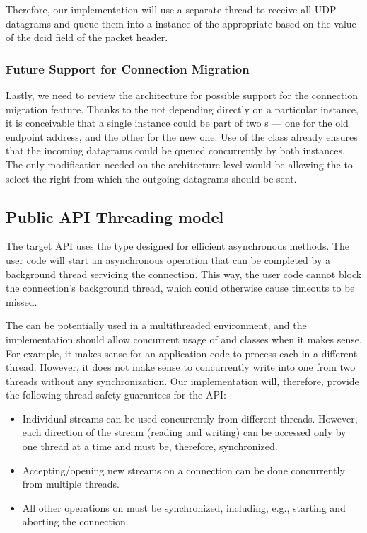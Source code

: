 Therefore, our implementation will use a separate thread to receive all UDP datagrams and queue them
into a \ChannelOf{} instance of the appropriate \QuicConnectionContext{} based on the value of the
\gls{dcid} field of the packet header.

\subsubsection{Future Support for Connection Migration}

Lastly, we need to review the architecture for possible support for the connection migration
feature. Thanks to the \QuicConnectionContext{} not depending directly on a particular \Socket{}
instance, it is conceivable that a single \QuicConnectionContext{} instance could be part of two
\QuicSocketContext{}s --- one for the old endpoint address, and the other for the new one. Use of
the \ChannelOf{} class already ensures that the incoming datagrams could be queued concurrently by
both \QuicSocketContext{} instances. The only modification needed on the architecture level would be
allowing the \QuicConnectionContext{} to select the right \Socket{} from which the outgoing
datagrams should be sent.

\subsection{Public API Threading model}

The target API uses the  type designed for efficient asynchronous methods. The user
code will start an asynchronous operation that can be completed by a background thread servicing the
connection. This way, the user code cannot block the connection's background thread, which could
otherwise cause timeouts to be missed.

The \QuicConnection{} can be potentially used in a multithreaded environment, and the implementation
should allow concurrent usage of \QuicConnection{} and \QuicStream{} classes when it makes sense.
For example, it makes sense for an application code to process each \QuicStream{} in a different
thread. However, it does not make sense to concurrently write into one \QuicStream{} from two
threads without any synchronization. Our implementation will, therefore, provide the following
thread-safety guarantees for the API\@:

\begin{itemize}

  \item Individual streams can be used concurrently from different threads. However, each direction
of the stream (reading and writing) can be accessed only by one thread at a time and must be,
therefore, synchronized.

  \item Accepting/opening new streams on a connection can be done concurrently from multiple
threads.

  \item All other operations on \QuicConnection{} must be synchronized, including, e.g., starting
and aborting the connection.

\end{itemize}

